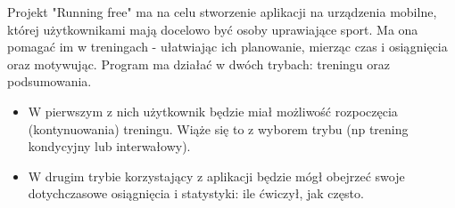 \nopagebreak
Projekt "Running free" ma na celu stworzenie aplikacji na urządzenia mobilne, której użytkownikami mają docelowo być osoby uprawiające sport. Ma ona pomagać im w treningach - ułatwiając ich planowanie, mierząc czas i osiągnięcia oraz motywując. 
Program ma działać w dwóch trybach: treningu oraz podsumowania.
\begin{itemize}
\item W pierwszym z nich użytkownik będzie miał możliwość rozpoczęcia (kontynuowania) treningu. Wiąże się to z wyborem trybu (np trening kondycyjny lub interwałowy).
\item W drugim trybie korzystający z aplikacji będzie mógł obejrzeć swoje dotychczasowe osiągnięcia i statystyki: ile ćwiczył, jak często. 
\end{itemize}
